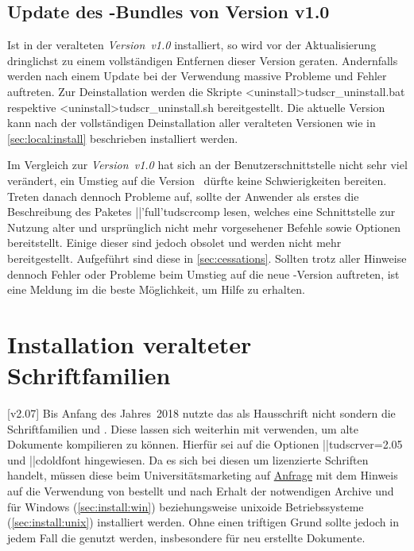 \subsection{Update des \TUDScript-Bundles von Version v1.0}
%
Ist \TUDScript in der veralteten \emph{Version~v1.0} installiert, so wird vor 
der Aktualisierung dringlichst zu einem vollständigen Entfernen dieser Version 
geraten. Andernfalls werden nach einem Update bei der Verwendung massive 
Probleme und Fehler auftreten. Zur Deinstallation werden die Skripte 
\GitHubDownload*<uninstall>{tudscr_uninstall.bat} respektive
\GitHubDownload*<uninstall>{tudscr_uninstall.sh} bereitgestellt. Die aktuelle 
Version~\vTUDScript{} kann nach der vollständigen Deinstallation aller 
veralteten Versionen wie in \autoref{sec:local:install} beschrieben installiert 
werden.

Im Vergleich zur \emph{Version~v1.0} hat sich an der Benutzerschnittstelle 
nicht sehr viel verändert, ein Umstieg auf die Version~\vTUDScript{} dürfte 
keine Schwierigkeiten bereiten. Treten danach dennoch Probleme auf, sollte der 
Anwender als erstes die Beschreibung des Paketes \Package||'full'{tudscrcomp} 
lesen, welches eine Schnittstelle zur Nutzung alter und ursprünglich nicht mehr 
vorgesehener Befehle sowie Optionen bereitstellt. Einige dieser sind jedoch 
obsolet und werden nicht mehr bereitgestellt. Aufgeführt sind diese in 
\autoref{sec:cessations}. Sollten trotz aller Hinweise dennoch Fehler oder 
Probleme beim Umstieg auf die neue \TUDScript-Version auftreten, ist eine 
Meldung im \Forum die beste Möglichkeit, um Hilfe zu erhalten.



\section{%
  Installation veralteter Schriftfamilien%
  \label{sec:install:fonts}%
}
%
%
[v2.07]
Bis Anfang des Jahres~2018 nutzte das \TUDCD als Hausschrift nicht \OpenSans 
sondern die Schriftfamilien \Univers und \DIN. Diese lassen sich weiterhin mit 
\TUDScript verwenden, um alte Dokumente kompilieren zu können. Hierfür sei auf 
die Optionen \Option||{tudscrver=2.05} und \Option||{cdoldfont} hingewiesen. 
Da es sich bei diesen um lizenzierte Schriften handelt, müssen diese beim 
Universitätsmarketing auf \href{https://tu-dresden.de/cd}{Anfrage} mit dem 
Hinweis auf die Verwendung von  bestellt und nach Erhalt der 
notwendigen Archive  und  für 
Windows (\autoref{sec:install:win}) beziehungsweise unixoide Betriebssysteme 
(\autoref{sec:install:unix}) installiert werden. Ohne einen triftigen Grund 
sollte jedoch in jedem Fall die \OpenSans genutzt werden, insbesondere für neu 
erstellte Dokumente.

